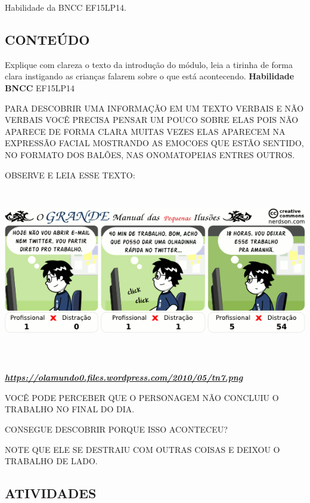 \begin{escola}
\protect\hypertarget{_heading=h.69rmtrb8c7jb}{}{}

\protect\hypertarget{_heading=h.23ckvvd}{}{}Habilidade da BNCC
EF15LP14.

\subsection{CONTEÚDO}\label{conteuxfado-6}

Explique com clareza o texto da introdução do módulo, leia a tirinha de
forma clara instigando as crianças falarem sobre o que está acontecendo.
\textbf{Habilidade BNCC} EF15LP14

PARA DESCOBRIR UMA INFORMAÇÃO EM UM TEXTO VERBAIS E NÃO VERBAIS VOCÊ
PRECISA PENSAR UM POUCO SOBRE ELAS POIS NÃO APARECE DE FORMA CLARA
MUITAS VEZES ELAS APARECEM NA EXPRESSÃO FACIAL MOSTRANDO AS EMOCOES QUE
ESTÃO SENTIDO, NO FORMATO DOS BALÕES, NAS ONOMATOPEIAS ENTRES OUTROS.

OBSERVE E LEIA ESSE TEXTO:
\includegraphics[width=6.51667in,height=3.14097in]{media/image170.png}

\href{https://olamundo0.files.wordpress.com/2010/05/tn7.png}{\textbf{\emph{https://olamundo0.files.wordpress.com/2010/05/tn7.png}}}

VOCÊ PODE PERCEBER QUE O PERSONAGEM NÃO CONCLUIU O TRABALHO NO FINAL DO
DIA.

CONSEGUE DESCOBRIR PORQUE ISSO ACONTECEU?

NOTE QUE ELE SE DESTRAIU COM OUTRAS COISAS E DEIXOU O TRABALHO DE LADO.

\subsection{ATIVIDADES}\label{atividades-6}


\end{escola}

